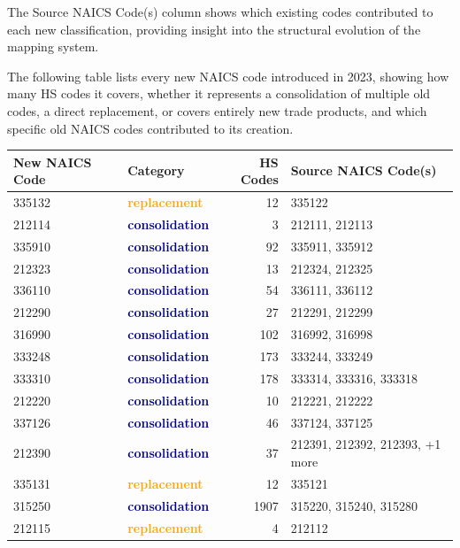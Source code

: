 \documentclass[11pt]{article}
\begin{document}
The Source NAICS Code(s) column shows which existing codes contributed to each new classification, providing insight into the structural evolution of the mapping system.

The following table lists every new NAICS code introduced in 2023, showing how many HS codes it covers, whether it represents a consolidation of multiple old codes, a direct replacement, or covers entirely new trade products, and which specific old NAICS codes contributed to its creation.

\begin{table}[H]
\centering
{}
\begin{tabular}{llrl}
\toprule
\textbf{New NAICS Code} & \textbf{Category} & \textbf{HS Codes} & \textbf{Source NAICS Code(s)} \\
\midrule
335132 & \textcolor{orange}{\textbf{replacement}} & 12 & 335122 \\
212114 & \textcolor{darkblue}{\textbf{consolidation}} & 3 & 212111, 212113 \\
335910 & \textcolor{darkblue}{\textbf{consolidation}} & 92 & 335911, 335912 \\
212323 & \textcolor{darkblue}{\textbf{consolidation}} & 13 & 212324, 212325 \\
336110 & \textcolor{darkblue}{\textbf{consolidation}} & 54 & 336111, 336112 \\
212290 & \textcolor{darkblue}{\textbf{consolidation}} & 27 & 212291, 212299 \\
316990 & \textcolor{darkblue}{\textbf{consolidation}} & 102 & 316992, 316998 \\
333248 & \textcolor{darkblue}{\textbf{consolidation}} & 173 & 333244, 333249 \\
333310 & \textcolor{darkblue}{\textbf{consolidation}} & 178 & 333314, 333316, 333318 \\
212220 & \textcolor{darkblue}{\textbf{consolidation}} & 10 & 212221, 212222 \\
337126 & \textcolor{darkblue}{\textbf{consolidation}} & 46 & 337124, 337125 \\
212390 & \textcolor{darkblue}{\textbf{consolidation}} & 37 & 212391, 212392, 212393, +1 more \\
335131 & \textcolor{orange}{\textbf{replacement}} & 12 & 335121 \\
315250 & \textcolor{darkblue}{\textbf{consolidation}} & 1907 & 315220, 315240, 315280 \\
212115 & \textcolor{orange}{\textbf{replacement}} & 4 & 212112 \\

\end{tabular}
\end{table}
\end{document}
